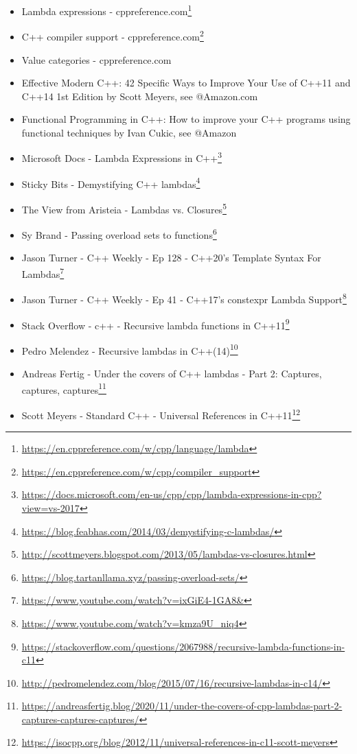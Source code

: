 \begin{itemize}
\item Lambda expressions - cppreference.com\footnote{\url{https://en.cppreference.com/w/cpp/language/lambda}}
\item C++ compiler support - cppreference.com\footnote{\url{https://en.cppreference.com/w/cpp/compiler_support}}
\item Value categories - cppreference.com
\item Effective Modern C++: 42 Specific Ways to Improve Your Use of C++11 and C++14 1st Edition by Scott Meyers, see @Amazon.com
\item Functional Programming in C++: How to improve your C++ programs using functional techniques by Ivan Cukic, see @Amazon
\item Microsoft Docs - Lambda Expressions in C++\footnote{\url{https://docs.microsoft.com/en-us/cpp/cpp/lambda-expressions-in-cpp?view=vs-2017}}
\item Sticky Bits - Demystifying C++ lambdas\footnote{\url{https://blog.feabhas.com/2014/03/demystifying-c-lambdas/}}
\item The View from Aristeia - Lambdas vs. Closures\footnote{\url{http://scottmeyers.blogspot.com/2013/05/lambdas-vs-closures.html}}
\item Sy Brand - Passing overload sets to functions\footnote{\url{https://blog.tartanllama.xyz/passing-overload-sets/}}
\item Jason Turner - C++ Weekly - Ep 128 - C++20's Template Syntax For Lambdas\footnote{\url{https://www.youtube.com/watch?v=ixGiE4-1GA8&}}
\item Jason Turner - C++ Weekly - Ep 41 - C++17's constexpr Lambda Support\footnote{\url{https://www.youtube.com/watch?v=kmza9U_niq4}}
\item Stack Overflow - c++ - Recursive lambda functions in C++11\footnote{\url{https://stackoverflow.com/questions/2067988/recursive-lambda-functions-in-c11}}
\item Pedro Melendez - Recursive lambdas in C++(14)\footnote{\url{http://pedromelendez.com/blog/2015/07/16/recursive-lambdas-in-c14/}}
\item Andreas Fertig - Under the covers of C++ lambdas - Part 2: Captures, captures, captures\footnote{\url{https://andreasfertig.blog/2020/11/under-the-covers-of-cpp-lambdas-part-2-captures-captures-captures/}}
\item Scott Meyers - Standard C++ - Universal References in C++11\footnote{\url{https://isocpp.org/blog/2012/11/universal-references-in-c11-scott-meyers}}

\end{itemize}
